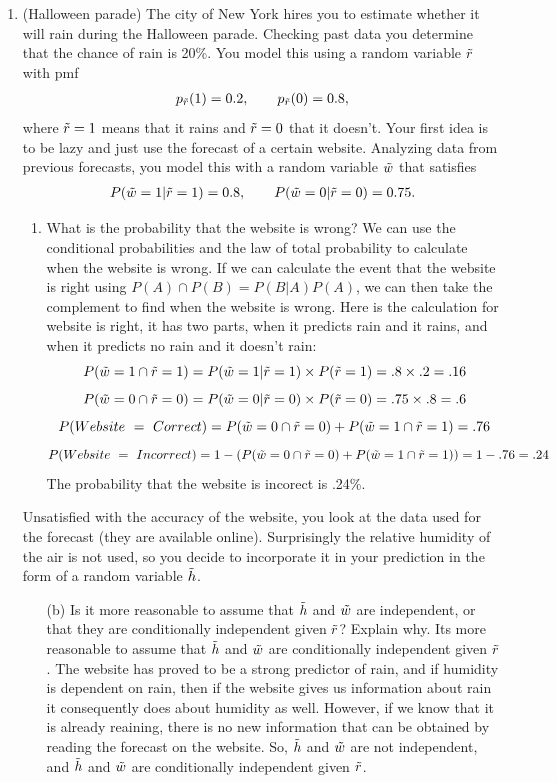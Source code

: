 \documentclass[12pt,twoside]{article}
\newcommand{\rnd}{\Tilde}
\begin{document}
\begin{enumerate}
\item (Halloween parade)
The city of New York hires you to estimate whether it will rain during the Halloween parade. Checking past data you determine that the chance of rain is 20\%. You model this using a random variable $\rnd{r}$ with pmf
\begin{align*}
 p_{\rnd{r}}(1) = 0.2, \qquad p_{\rnd{r}}(0)=0.8,
\end{align*}
where $\rnd{r}=1$ means that it rains and $\rnd{r}=0$ that it doesn't. Your first idea is to be lazy and just use the forecast of a certain website. Analyzing data from previous forecasts, you model this with a random variable $\rnd{w}$ that satisfies 
\begin{align*}
 P(\rnd{w}=1| \rnd{r}=1) = 0.8, \qquad P(\rnd{w}=0| \rnd{r}=0) = 0.75.
\end{align*}
\begin{enumerate}
\item What is the probability that the website is wrong?
\subitem
We can use the conditional probabilities and the law of total probability to calculate when the website is wrong. If we can calculate the event that the website is right using $P(A)\cap P(B) = P(B|A)P(A)$, we can then take the complement to find when the website is wrong. Here is the calculation for website is right, it has two parts, when it predicts rain and it rains, and when it predicts no rain and it doesn't rain:
$$
 P(\rnd{w}=1\cap \rnd{r}=1) = P(\rnd{w}=1|\rnd{r}=1) \times P(\rnd{r}=1) = .8 \times .2 = .16
$$
$$
 P(\rnd{w}=0\cap \rnd{r}=0) = P(\rnd{w}=0|\rnd{r}=0) \times P(\rnd{r}=0) = .75 \times .8 = .6
$$
$$  
    P(Website \ = \ Correct) = P(\rnd{w}=0\cap \rnd{r}=0) + P(\rnd{w}=1\cap \rnd{r}=1) = .76
$$
$$  
    P(Website \ = \ Incorrect) = 1 - (P(\rnd{w}=0\cap \rnd{r}=0) + P(\rnd{w}=1\cap \rnd{r}=1)) =1 - .76 = .24
$$
The probability that the website is incorect is .24\%.
\end{enumerate}
Unsatisfied with the accuracy of the website, you look at the data used for the forecast (they are available online). Surprisingly the relative humidity of the air is not used, so you decide to incorporate it in your prediction in the form of a random variable $\rnd{h}$. 
\begin{enumerate}
 \item[(b)] Is it more reasonable to assume that $\rnd{h}$ and $\rnd{w}$ are independent, or that they are conditionally independent given $\rnd{r}$? Explain why.
 \subitem Its more reasonable to assume that $\rnd{h}$ and $\rnd{w}$ are conditionally independent given $\rnd{r}$. The website has proved to be a strong predictor of rain, and if humidity is dependent on rain, then if the website gives us information about rain it consequently does about humidity as well. However, if we know that it is already reaining, there is no new information that can be obtained by reading the forecast on the website. So, $\rnd{h}$ and $\rnd{w}$ are not independent, and $\rnd{h}$ and $\rnd{w}$ are conditionally independent given $\rnd{r}$.

\end{enumerate}
\end{enumerate}
\end{document}
